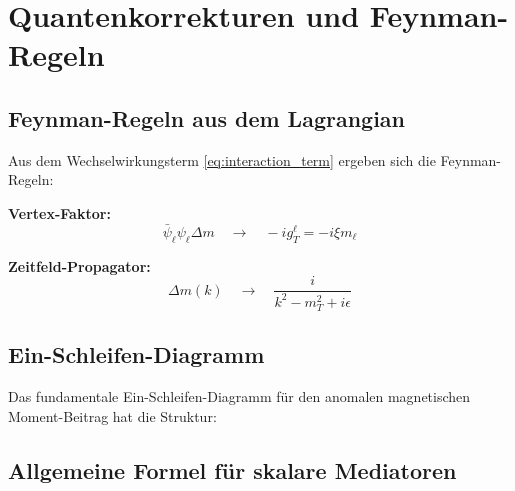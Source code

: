 	\section{Quantenkorrekturen und Feynman-Regeln}
	
	\subsection{Feynman-Regeln aus dem Lagrangian}
	
	Aus dem Wechselwirkungsterm \eqref{eq:interaction_term} ergeben sich die Feynman-Regeln:
	
	\textbf{Vertex-Faktor:}
	\begin{equation}
		\bar{\psi}_\ell \psi_\ell \Delta m \quad \longrightarrow \quad -i g_T^\ell = -i \xi m_\ell
		\label{eq:vertex_factor}
	\end{equation}
	
	\textbf{Zeitfeld-Propagator:}
	\begin{equation}
		\Delta m(k) \quad \longrightarrow \quad \frac{i}{k^2 - m_T^2 + i\epsilon}
		\label{eq:propagator}
	\end{equation}
	
	\subsection{Ein-Schleifen-Diagramm}
	
	Das fundamentale Ein-Schleifen-Diagramm für den anomalen magnetischen Moment-Beitrag hat die Struktur:
\begin{center}
\end{center}


	
	\subsection{Allgemeine Formel für skalare Mediatoren}
	
